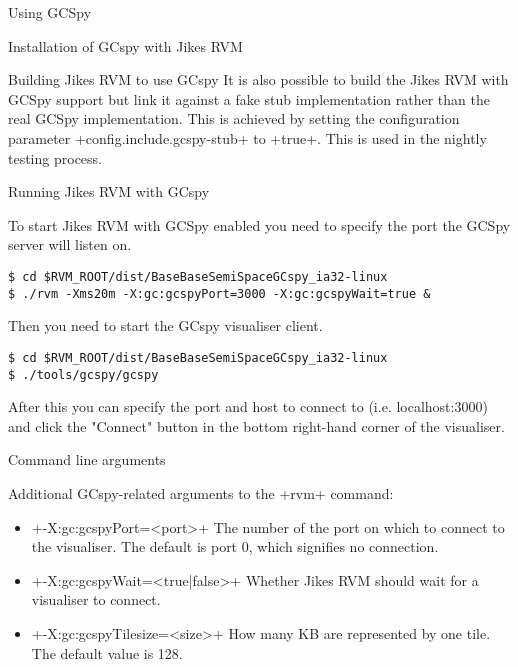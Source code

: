 \begin{section}{Using GCSpy}
\begin{subsection}{Installation of GCspy with Jikes RVM}
\begin{subsubsection}{Building Jikes RVM to use GCspy}
It is also possible to build the Jikes RVM with GCSpy support but link it against a fake stub implementation rather than the real GCSpy implementation. This is achieved by setting the configuration parameter \spverb+config.include.gcspy-stub+ to \spverb+true+. This is used in the nightly testing process.

\end{subsubsection}

\begin{subsubsection}{Running Jikes RVM with GCspy}

To start Jikes RVM with GCSpy enabled you need to specify the port the GCSpy server will listen on.
\begin{lstlisting}
$ cd $RVM_ROOT/dist/BaseBaseSemiSpaceGCspy_ia32-linux
$ ./rvm -Xms20m -X:gc:gcspyPort=3000 -X:gc:gcspyWait=true &
\end{lstlisting}

Then you need to start the GCspy visualiser client.
\begin{lstlisting}
$ cd $RVM_ROOT/dist/BaseBaseSemiSpaceGCspy_ia32-linux
$ ./tools/gcspy/gcspy
\end{lstlisting}

After this you can specify the port and host to connect to (i.e. localhost:3000) and click the "Connect" button in the bottom right-hand corner of the visualiser.

\end{subsubsection}

\end{subsection}

\begin{subsection}{Command line arguments}

Additional GCspy-related arguments to the \spverb+rvm+ command:
\begin{itemize}
  \item \spverb+-X:gc:gcspyPort=<port>+ \newline
    The number of the port on which to connect to the visualiser. The default is port 0, which signifies no connection.
  \item \spverb+-X:gc:gcspyWait=<true|false>+ \newline
    Whether Jikes RVM should wait for a visualiser to connect.
  \item \spverb+-X:gc:gcspyTilesize=<size>+ \newline
    How many KB are represented by one tile. The default value is 128.
\end{itemize}


\end{subsection}
\end{section}
